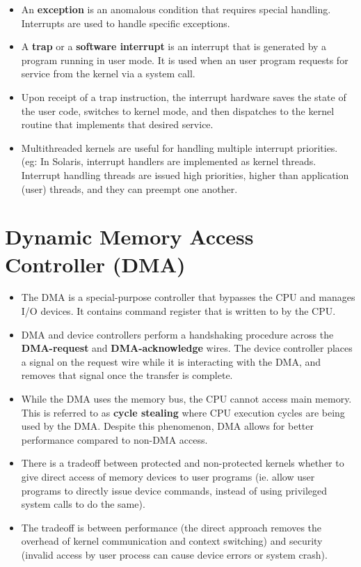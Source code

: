 \documentclass{article}
\theoremstyle{plain}
\theoremstyle{definition}
\begin{document}
\begin{itemize}
    \item An \textbf{exception} is an anomalous condition that requires special handling. Interrupts are used to handle specific exceptions.
    
    \item A \textbf{trap} or a \textbf{software interrupt} is an interrupt that is generated by a program running in user mode. It is used when an user program requests for service from the kernel via a system call. 
    
    \item Upon receipt of a trap instruction, the interrupt hardware saves the state of the user code, switches to kernel mode, and then dispatches to the kernel routine that implements that desired service. 
    
    \item Multithreaded kernels are useful for handling multiple interrupt priorities. (eg: In Solaris, interrupt handlers are implemented as kernel threads. Interrupt handling threads are issued high priorities, higher than application (user) threads, and they can preempt one another. 
\end{itemize}

\section{Dynamic Memory Access Controller (DMA)}
\begin{itemize}
    \item The DMA is a special-purpose controller that bypasses the CPU and manages I/O devices. It contains command register that is written to by the CPU. 
    
    \item DMA and device controllers perform a handshaking procedure across the \textbf{DMA-request} and \textbf{DMA-acknowledge} wires. The device controller places a signal on the request wire while it is interacting with the DMA, and removes that signal once the transfer is complete. 
    
    \item While the DMA uses the memory bus, the CPU cannot access main memory. This is referred to as \textbf{cycle stealing} where CPU execution cycles are being used by the DMA. Despite this phenomenon, DMA allows for better performance compared to non-DMA access. 
    
    \item There is a tradeoff between protected and non-protected kernels whether to give direct access of memory devices to user programs (ie. allow user programs to directly issue device commands, instead of using privileged system calls to do the same). 
    
    \item The tradeoff is between performance (the direct approach removes the overhead of kernel communication and context switching) and security (invalid access by user process can cause device errors or system crash). 
\end{itemize}
\end{document}
